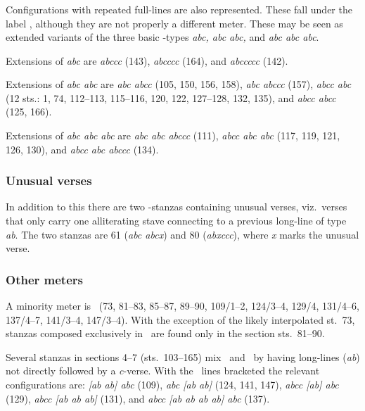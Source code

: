 \subsubsection{\Galdralag}

Configurations with repeated full-lines are also represented.  These fall under the label \Galdralag, although they are not properly a different meter.  These may be seen as extended variants of the three basic \Ljodahattr-types \emph{abc, abc abc,} and \emph{abc abc abc}.

Extensions of \emph{abc} are \emph{abccc} (143), \emph{abcccc} (164), and \emph{abccccc} (142).

Extensions of \emph{abc abc} are \emph{abc abcc} (105, 150, 156, 158), \emph{abc abccc} (157), \emph{abcc abc} (12 sts.: 1, 74, 112--113, 115--116, 120, 122, 127--128, 132, 135), and \emph{abcc abcc} (125, 166).

Extensions of \emph{abc abc abc} are \emph{abc abc abccc} (111), \emph{abcc abc abc} (117, 119, 121, 126, 130), and \emph{abcc abc abccc} (134).

\subsubsection{Unusual verses}

In addition to this there are two \Ljodahattr-stanzas containing unusual verses, viz.~verses that only carry one alliterating stave connecting to a previous long-line of type \emph{ab}.  The two stanzas are 61 (\emph{abc abcx}) and 80 (\emph{abxccc}), where \emph{x} marks the unusual verse.

\subsubsection{Other meters}

A minority meter is \Malahattr\ (73, 81--83, 85--87, 89--90, 109/1--2, 124/3--4, 129/4, 131/4--6, 137/4--7, 141/3--4, 147/3--4).  With the exception of the likely interpolated st.~73, stanzas composed exclusively in \Malahattr\ are found only in the section sts.~81--90.

Several stanzas in sections 4--7 (sts.~103--165) mix \Malahattr\ and \Ljodahattr\ by having long-lines (\emph{ab}) not directly followed by a \emph{c}-verse.  With the \Malahattr\ lines bracketed the relevant configurations are: \emph{[ab ab] abc} (109), \emph{abc [ab ab]} (124, 141, 147), \emph{abcc [ab] abc} (129), \emph{abcc [ab ab ab]} (131), and \emph{abcc [ab ab ab ab] abc} (137).

